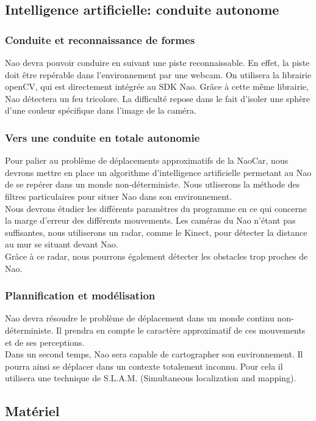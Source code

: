 \documentclass[11pt]{report} %
\begin{document}
		\subsection{Intelligence artificielle: conduite autonome}
			\subsubsection{Conduite et reconnaissance de formes}
				Nao devra pouvoir conduire en suivant une piste reconnaissable. En effet, la piste doit être repérable dans l'environnement par une webcam. On utilisera la librairie openCV, qui est directement intégrée au SDK Nao. Grâce à cette même librairie, Nao détectera un feu tricolore. La difficulté repose dans le fait d'isoler une sphère d'une couleur spécifique dans l'image de la caméra.
			\subsubsection{Vers une conduite en totale autonomie}
				Pour palier au problème de déplacements approximatifs de la NaoCar, nous devrons mettre en place un algorithme d'intelligence artificielle permetant au Nao de se repérer dans un monde non-déterministe. Nous utliserons la méthode des filtres particulaires pour situer Nao dans son environnement. \\ Nous devrons étudier les différents paramètres du programme en ce qui concerne la marge d'erreur des différents mouvements. Les caméras du Nao n'étant pas suffisantes, nous utiliserons un radar, comme le Kinect, pour détecter la distance au mur se situant devant Nao.\\
Grâce à ce radar, nous pourrons également détecter les obstacles trop proches de Nao.
			\subsubsection{Plannification et modélisation}	
				Nao devra résoudre le problème de déplacement dans un monde continu non-déterministe.
				Il prendra en compte le caractère approximatif de ces mouvements et de ses perceptions.\\
				Dans un second temps, Nao sera capable de cartographer son environnement. Il pourra ainsi se déplacer dans un contexte totalement inconnu. Pour cela il utilisera une technique de S.L.A.M. (Simultaneous localization and mapping).
		\subsection{Matériel}
\end{document}

